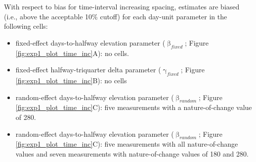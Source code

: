 \documentclass[
12pt, %
twoside,
english]{guelphthesis}
\theoremstyle{definition}
\theoremstyle{definition}
\theoremstyle{definition}
\theoremstyle{definition}
\theoremstyle{remark}
\begin{document}
With respect to bias for time-interval increasing spacing, estimates are biased (i.e., above the acceptable 10\% cutoff) for each day-unit parameter in the following cells:
\begin{itemize}
\tightlist
\item
  fixed-effect days-to-halfway elevation parameter (\(\upbeta_{fixed}\); Figure \ref{fig:exp1_plot_time_inc}A): no cells.
\item
  fixed-effect halfway-triquarter delta parameter (\(\upgamma_{fixed}\); Figure \ref{fig:exp1_plot_time_inc}B): no cells
\item
  random-effect days-to-halfway elevation parameter (\(\upbeta_{random}\); Figure \ref{fig:exp1_plot_time_inc}C): five measurements with a nature-of-change value of 280.
\item
  random-effect days-to-halfway elevation parameter (\(\upbeta_{random}\); Figure \ref{fig:exp1_plot_time_inc}C): five measurements with all nature-of-change values and seven measurements with nature-of-change values of 180 and 280.
\end{itemize}
\end{document}
